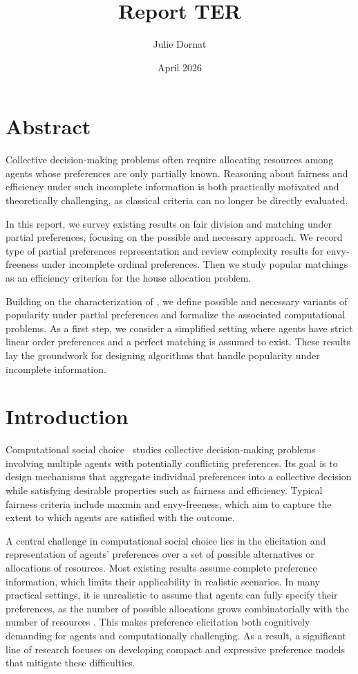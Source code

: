\documentclass{article}
\title{Report TER}
\author{Julie Dornat}
\date{April 2026}
\begin{document}
\maketitle

\section{Abstract}

Collective decision-making problems often require allocating resources among agents whose preferences are only partially known. 
Reasoning about fairness and efficiency under such incomplete information is both practically motivated and theoretically challenging, as classical criteria can no longer be directly evaluated.

In this report, we survey existing results on fair division and matching under partial preferences, focusing on the possible and necessary approach. 
We record type of partial preferences representation and review complexity results for envy-freeness under incomplete ordinal preferences. Then we study popular matchings as an efficiency criterion for the house allocation problem.

Building on the characterization of \cite{abraham2007popular}, we define possible and necessary variants of popularity under partial preferences and formalize the associated computational problems. 
As a first step, we consider a simplified setting where agents have strict linear order preferences and a perfect matching is assumed to exist.
These results lay the groundwork for designing algorithms that handle popularity under incomplete information.

\section{Introduction}

Computational social choice~\citep{brandt2016handbook} studies collective decision-making problems involving multiple agents with potentially conflicting preferences. 
Its goal is to design mechanisms that aggregate individual preferences into a collective decision while satisfying desirable properties such as fairness and efficiency. 
Typical fairness criteria include maxmin and envy-freeness, which aim to capture the extent to which agents are satisfied with the outcome.

A central challenge in computational social choice lies in the elicitation and representation of agents' preferences over a set of possible alternatives or allocations of resources. 
Most existing results assume complete preference information, which limits their applicability in realistic scenarios.
In many practical settings, it is unrealistic to assume that agents can fully specify their preferences, as the number of possible allocations grows combinatorially with the number of resources \citep[~Chapter 10, p224]{brandt2016handbook}. 
This makes preference elicitation both cognitively demanding for agents and computationally challenging. 
As a result, a significant line of research focuses on developing compact and expressive preference models that mitigate these difficulties.
\end{document}
